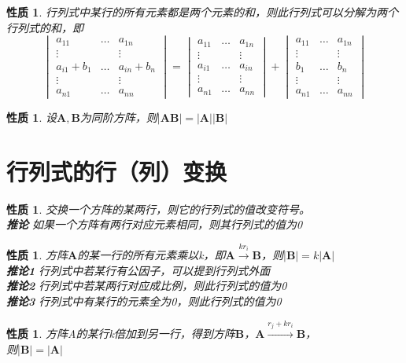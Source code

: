 \documentclass[a4paper]{ctexbook}
\newtheorem{property}[section]{性质}
\begin{document}
\begin{property}
    行列式中某行的所有元素都是两个元素的和，则此行列式可以分解为两个行列式的和，即
    \[\begin{vmatrix}
        a_{11}&\dots&a_{1n}
        \\\vdots&&\vdots
        \\a_{i1}+b_1&\dots&a_{in}+b_n
        \\\vdots&&\vdots
        \\a_{n1}&\dots&a_{nn}
    \end{vmatrix}
    =\begin{vmatrix}
        a_{11}&\dots&a_{1n}
        \\\vdots&&\vdots
        \\a_{i1}&\dots&a_{in}
        \\\vdots&&\vdots
        \\a_{n1}&\dots&a_{nn}
    \end{vmatrix}+
    \begin{vmatrix}
        a_{11}&\dots&a_{1n}
        \\\vdots&&\vdots
        \\b_1&\dots&b_n
        \\\vdots&&\vdots
        \\a_{n1}&\dots&a_{nn}
    \end{vmatrix}\]
\end{property}
\begin{property}
    设\(\mathbf{A},\mathbf{B}\)为同阶方阵，则\(\rvert \mathbf{A}\mathbf{B} \rvert = \rvert\mathbf{A}\rvert\rvert \mathbf{B}\rvert\)
\end{property}

\section{行列式的行（列）变换}
\begin{property}
    交换一个方阵的某两行，则它的行列式的值改变符号。
    \\ \textbf{推论} 如果一个方阵有两行对应元素相同，则其行列式的值为0
\end{property}

\begin{property}
    方阵\(\mathbf{A}\)的某一行的所有元素乘以k，即\(\mathbf{A}\xrightarrow{kr_i}\mathbf{B}\)，则\(\rvert\mathbf{B}\rvert=k\rvert\mathbf{A}\rvert\)
    \\ \textbf{推论1} 行列式中若某行有公因子，可以提到行列式外面
    \\ \textbf{推论2} 行列式中若某两行对应成比例，则此行列式的值为0
    \\ \textbf{推论3} 行列式中有某行的元素全为0，则此行列式的值为0
\end{property}

\begin{property}
    方阵A的某行k倍加到另一行，得到方阵\(\mathbf{B}\)，\(\mathbf{A} \xrightarrow{r_j+kr_i} \mathbf{B}\)，
    \\则\(\rvert\mathbf{B}\rvert=\rvert\mathbf{A}\rvert\)
\end{property}
\end{document}
